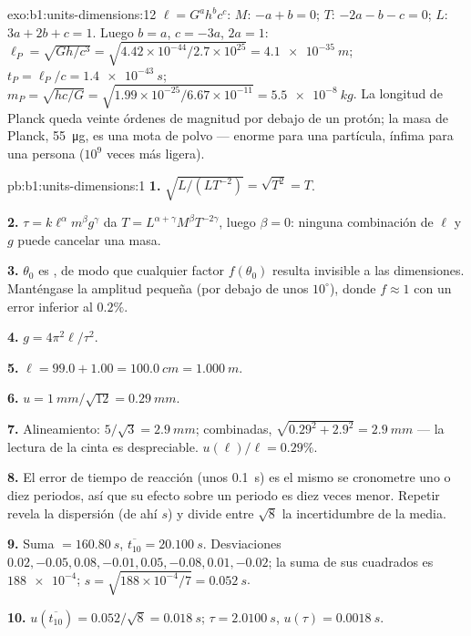 \begin{solution}{exo:b1:units-dimensions:12}
$\ell = G^a h^b c^c$: $M$: $-a + b = 0$; $T$: $-2a - b - c = 0$; $L$:
$3a + 2b + c = 1$. Luego $b = a$, $c = -3a$, $2a = 1$:
$\ell_P = \sqrt{Gh/c^3} = \sqrt{4.42\times10^{-44}/2.7\times10^{25}}
= \qty{4.1e-35}{m}$; $t_P = \ell_P/c = \qty{1.4e-43}{s}$;
$m_P = \sqrt{hc/G} = \sqrt{1.99\times10^{-25}/6.67\times10^{-11}}
= \qty{5.5e-8}{kg}$. La longitud de Planck queda veinte órdenes de
magnitud por debajo de un protón; la masa de Planck, \qty{55}{\micro g},
es una mota de polvo --- enorme para una partícula, ínfima para una
persona ($10^9$ veces más ligera).
\end{solution}

\begin{solution}{pb:b1:units-dimensions:1}
\textbf{1.} $\sqrt{L/(L T^{-2})} = \sqrt{T^2} = T$.

\textbf{2.} $\tau = k\ell^\alpha m^\beta g^\gamma$ da
$T = L^{\alpha+\gamma} M^\beta T^{-2\gamma}$, luego $\beta = 0$: ninguna
combinación de $\ell$ y $g$ puede cancelar una masa.

\textbf{3.} $\theta_0$ es , de modo que cualquier factor
$f(\theta_0)$ resulta invisible a las dimensiones. Manténgase la amplitud
pequeña (por debajo de unos $10^\circ$), donde $f \approx 1$ con un error
inferior al $0.2\%$.

\textbf{4.} $g = 4\pi^2\ell/\tau^2$.

\textbf{5.} $\ell = 99.0 + 1.00 = \qty{100.0}{cm} = \qty{1.000}{m}$.

\textbf{6.} $u = \qty{1}{mm}/\sqrt{12} = \qty{0.29}{mm}$.

\textbf{7.} Alineamiento: $5/\sqrt3 = \qty{2.9}{mm}$; combinadas,
$\sqrt{0.29^2 + 2.9^2} = \qty{2.9}{mm}$ --- la lectura de la cinta es
despreciable. $u(\ell)/\ell = 0.29\%$.

\textbf{8.} El error de tiempo de reacción (unos \qty{0.1}{s}) es el
mismo se cronometre uno o diez periodos, así que su efecto sobre un
periodo es diez veces menor. Repetir revela la dispersión (de ahí $s$) y
divide entre $\sqrt8$ la incertidumbre de la media.

\textbf{9.} Suma $= \qty{160.80}{s}$, $\overline{t_{10}} = \qty{20.100}{s}$.
Desviaciones $0.02, -0.05, 0.08, -0.01, 0.05, -0.08, 0.01, -0.02$; la suma
de sus cuadrados es $\num{188e-4}$; $s = \sqrt{188\times10^{-4}/7} = \qty{0.052}{s}$.

\textbf{10.} $u(\overline{t_{10}}) = 0.052/\sqrt8 = \qty{0.018}{s}$;
$\tau = \qty{2.0100}{s}$, $u(\tau) = \qty{0.0018}{s}$.


\end{solution}
